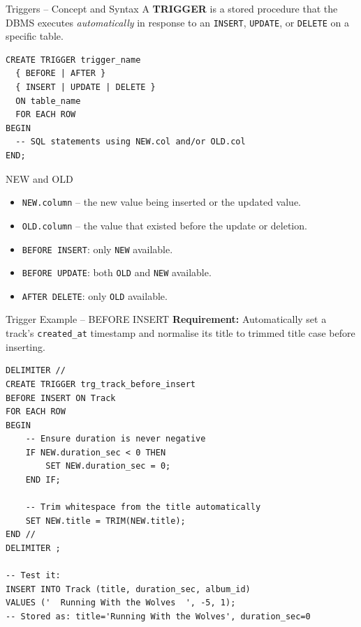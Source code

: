\begin{frame}[fragile]{Triggers -- Concept and Syntax}
  A \textbf{TRIGGER} is a stored procedure that the DBMS executes \emph{automatically}
  in response to an \texttt{INSERT}, \texttt{UPDATE}, or \texttt{DELETE} on a specific table.

  \begin{lstlisting}[style=sqlstyle]
CREATE TRIGGER trigger_name
  { BEFORE | AFTER }
  { INSERT | UPDATE | DELETE }
  ON table_name
  FOR EACH ROW
BEGIN
  -- SQL statements using NEW.col and/or OLD.col
END;
  \end{lstlisting}

  \begin{block}{NEW and OLD}
    \begin{itemize}
      \item \texttt{NEW.column} -- the new value being inserted or the updated value.
      \item \texttt{OLD.column} -- the value that existed before the update or deletion.
      \item \texttt{BEFORE INSERT}: only \texttt{NEW} available.
      \item \texttt{BEFORE UPDATE}: both \texttt{OLD} and \texttt{NEW} available.
      \item \texttt{AFTER DELETE}: only \texttt{OLD} available.
    \end{itemize}
  \end{block}
\end{frame}

\begin{frame}[fragile]{Trigger Example -- BEFORE INSERT}
  \textbf{Requirement:} Automatically set a track's \texttt{created\_at} timestamp and
  normalise its title to trimmed title case before inserting.

  \begin{lstlisting}[style=sqlstyle]
DELIMITER //
CREATE TRIGGER trg_track_before_insert
BEFORE INSERT ON Track
FOR EACH ROW
BEGIN
    -- Ensure duration is never negative
    IF NEW.duration_sec < 0 THEN
        SET NEW.duration_sec = 0;
    END IF;

    -- Trim whitespace from the title automatically
    SET NEW.title = TRIM(NEW.title);
END //
DELIMITER ;

-- Test it:
INSERT INTO Track (title, duration_sec, album_id)
VALUES ('  Running With the Wolves  ', -5, 1);
-- Stored as: title='Running With the Wolves', duration_sec=0
  \end{lstlisting}
\end{frame}

